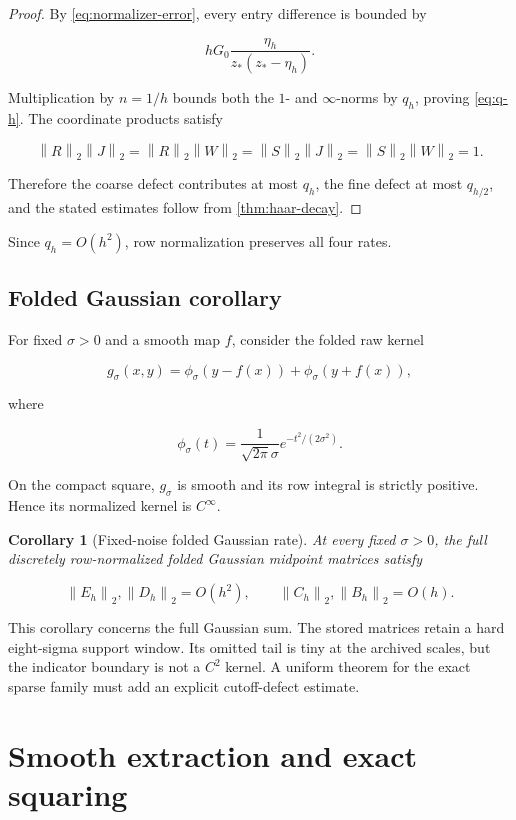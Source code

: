 \documentclass[11pt]{article}
\newtheorem{corollary}[theorem]{Corollary}
\theoremstyle{definition}
\theoremstyle{remark}
\newcommand{\norm}[1]{\left\lVert #1\right\rVert}
\begin{document}
\begin{proof}
By \eqref{eq:normalizer-error}, every entry difference is bounded by

\[
hG_0\frac{\eta_h}{z_*(z_*-\eta_h)}.
\]

Multiplication by $n=1/h$ bounds both the $1$- and $\infty$-norms by $q_h$,
proving \eqref{eq:q-h}.  The coordinate products satisfy

\[
\norm{R}_2\norm{J}_2=\norm{R}_2\norm{W}_2
=\norm{S}_2\norm{J}_2=\norm{S}_2\norm{W}_2=1.
\]

Therefore the coarse defect contributes at most $q_h$, the fine defect at
most $q_{h/2}$, and the stated estimates follow from
\cref{thm:haar-decay}.
\end{proof}

Since $q_h=O(h^2)$, row normalization preserves all four rates.

\subsection{Folded Gaussian corollary}

For fixed $\sigma>0$ and a smooth map $f$, consider the folded raw kernel

\begin{equation}
g_\sigma(x,y)=\phi_\sigma(y-f(x))+\phi_\sigma(y+f(x)),
\label{eq:folded-raw}
\end{equation}

where

\[
\phi_\sigma(t)=\frac{1}{\sqrt{2\pi}\sigma}
e^{-t^2/(2\sigma^2)}.
\]

On the compact square, $g_\sigma$ is smooth and its row integral is strictly
positive.  Hence its normalized kernel is $C^\infty$.

\begin{corollary}[Fixed-noise folded Gaussian rate]
\label{cor:gaussian}
At every fixed $\sigma>0$, the full discretely row-normalized folded Gaussian
midpoint matrices satisfy

\[
\norm{E_h}_2,\norm{D_h}_2=O(h^2),\qquad
\norm{C_h}_2,\norm{B_h}_2=O(h).
\]
\end{corollary}

This corollary concerns the full Gaussian sum.  The stored matrices retain a
hard eight-sigma support window.  Its omitted tail is tiny at the archived
scales, but the indicator boundary is not a $C^2$ kernel.  A uniform theorem
for the exact sparse family must add an explicit cutoff-defect estimate.

\section{Smooth extraction and exact squaring}
\label{sec:physical}
\end{document}
